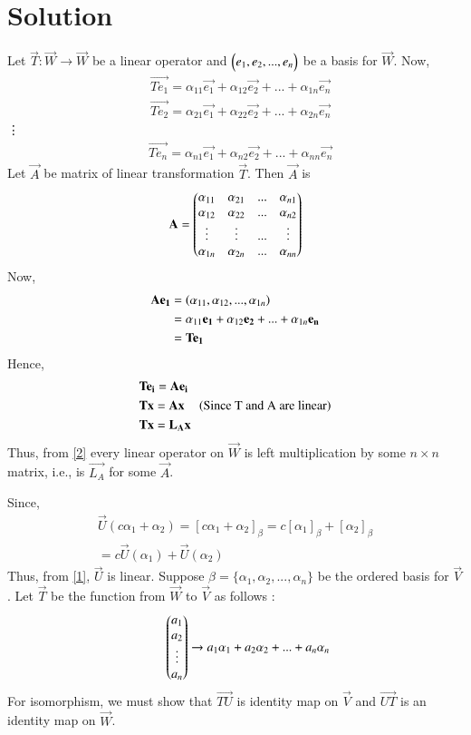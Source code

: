 \documentclass[journal,12pt,twocolumn]{IEEEtran}
\begin{document}
\section{Solution}
Let $\vec{T}:\vec{W} \to \vec{W}$ be a linear operator and ${\begin{pmatrix}e_{1}, e_{2},...,e_{n}\end{pmatrix}}$ be a basis for $\vec{W}$. Now,
\begin{align}
& \vec{Te_{1}} = \alpha_{11}\vec{e_1} + \alpha_{12}\vec{e_2} + ... + \alpha_{1n}\vec{e_n} \\
& \vec{Te_{2}} = \alpha_{21}\vec{e_1} + \alpha_{22}\vec{e_2} + ... + \alpha_{2n}\vec{e_n} 
\end{align}
\qquad \quad \vdots
\begin{align}
& \vec{Te_{n}} = \alpha_{n1}\vec{e_1} + \alpha_{n2}\vec{e_2} + ... + \alpha_{nn}\vec{e_n} 
\end{align}
Let $\vec{A}$ be matrix of linear transformation $\vec{T}$. Then $\vec{A}$ is
\begin{align}
\mathbf{A} = \begin{pmatrix}\alpha_{11} & \alpha_{21} & ... & \alpha_{n1} \\ \alpha_{12} & \alpha_{22} & ... & \alpha_{n2} \\ \vdots & \vdots & ... & \vdots \\  \alpha_{1n} & \alpha_{2n} & ... & \alpha_{nn} \end{pmatrix}
\end{align}
Now,
\begin{align}
\mathbf{Ae_{1}} & = \left(\alpha_{11}, \alpha_{12},...,\alpha_{1n}\right) \\ 
             & = \alpha_{11}\mathbf{e_1} + \alpha_{12}\mathbf{e_2} + ... + \alpha_{1n}\mathbf{e_n} \\
             & = \mathbf{Te_{1}}
\end{align}
Hence,
\begin{align}
& \mathbf{Te_{i}} = \mathbf{Ae_{i}} \\
& \mathbf{Tx} = \mathbf{Ax} \quad \left(\text{Since T and A are linear}\right) \\
& \mathbf{Tx} = \mathbf{L_Ax}\label{2}
\end{align}
Thus, from \eqref{2} every linear operator on $\vec{W}$ is left multiplication by some $n\times n$ matrix, i.e., is $\vec{L_{A}}$ for some $\vec{A}$.

Since,
\begin{multline}
\vec{U}(c\alpha_{1} + \alpha_{2}) = [c\alpha_{1} + \alpha_{2}]_{\beta} = c[\alpha_{1}]_{\beta} + [\alpha_{2}]_{\beta} \\ = c\vec{U}(\alpha_{1}) + \vec{U}(\alpha_{2}) \label{1}
\end{multline}
Thus, from \eqref{1}, $\vec{U}$ is linear. Suppose $\beta = \{\alpha_{1}, \alpha_{2},...,\alpha_{n}\}$ be the ordered basis for $\vec{V}$. Let $\vec{T}$ be the function from $\vec{W}$ to $\vec{V}$ as follows :
\begin{align}
\qquad \begin{pmatrix}a_1 \\ a_2 \\ \vdots \\a_n\end{pmatrix} \to a_1\alpha_{1} + a_2\alpha_{2} + ... + a_n\alpha_{n}
\end{align}
 For isomorphism, we must show that $\vec{TU}$ is identity map on $\vec{V}$ and $\vec{UT}$ is an identity map on $\vec{W}$.
\end{document}
